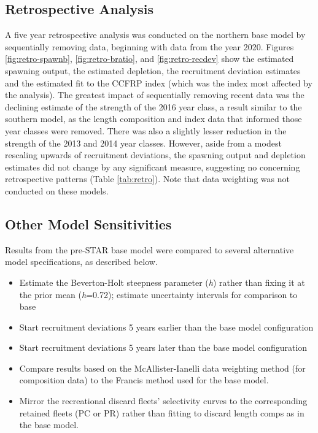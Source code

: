 \documentclass[
  english,
  a4paper,
]{article}
\providecommand{\tightlist}{%
  \setlength{\itemsep}{0pt}\setlength{\parskip}{0pt}}
\begin{document}
\hypertarget{retrospective-analysis}{%
\subsection{Retrospective Analysis}\label{retrospective-analysis}}

A five year retrospective analysis was conducted on the northern base model by sequentially removing data, beginning with data from the year 2020. Figures \ref{fig:retro-spawnb}, \ref{fig:retro-bratio}, and \ref{fig:retro-recdev} show the estimated spawning output, the estimated depletion, the recruitment deviation estimates and the estimated fit to the CCFRP index (which was the index most affected by the analysis). The greatest impact of sequentially removing recent data was the declining estimate of the strength of the 2016 year class, a result similar to the southern model, as the length composition and index data that informed those year classes were removed. There was also a slightly lesser reduction in the strength of the 2013 and 2014 year classes. However, aside from a modest rescaling upwards of recruitment deviations, the spawning output and depletion estimates did not change by any significant measure, suggesting no concerning retrospective patterns (Table \ref{tab:retro}). Note that data weighting was not conducted on these models.

\hypertarget{other-model-sensitivities}{%
\subsection{Other Model Sensitivities}\label{other-model-sensitivities}}

Results from the pre-STAR base model were compared to several alternative model specifications, as described below.

\begin{itemize}
\tightlist
\item
  Estimate the Beverton-Holt steepness parameter (\emph{h}) rather than fixing it at the prior mean (\emph{h}=0.72); estimate uncertainty intervals for comparison to base
\item
  Start recruitment deviations 5 years earlier than the base model configuration
\item
  Start recruitment deviations 5 years later than the base model configuration
\item
  Compare results based on the McAllister-Ianelli data weighting method (for composition data) to the Francis method used for the base model.
\item
  Mirror the recreational discard fleets' selectivity curves to the corresponding retained fleets (PC or PR) rather than fitting to discard length comps as in the base model.
\end{itemize}
\end{document}
